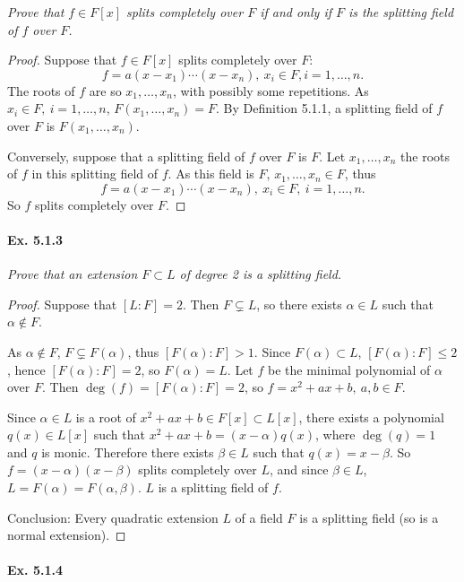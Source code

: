 \documentclass[11pt,a4paper]{article}
\begin{document}
{\it Prove that $f\in F[x]$ splits completely over $F$ if and only if $F$ is the splitting field of $f$ over $F$.
}

\begin{proof}
Suppose that $f \in F[x]$ splits completely over $F$:
$$f = a(x-x_1)\cdots(x-x_n), \ x_i \in F,i=1,\ldots,n.$$
The roots of $f$ are so $x_1,\ldots, x_n$, with possibly some repetitions. As $x_i \in F,\ i=1,\ldots,n$, $F(x_1,\ldots,x_n) = F$.
By Definition 5.1.1, a splitting field of $f$ over $F$ is  $F(x_1,\ldots,x_n)$. 

Conversely, suppose that a splitting field of $f$ over $F$ is $F$. Let $x_1,\ldots,x_n$ the roots of $f$ in this splitting field of $f$. As this field is $F$, $x_1,\ldots ,x_n \in F$, thus
$$f = a(x-x_1)\cdots(x-x_n), \ x_i \in F,\ i=1,\ldots,n.$$
So $f$ splits completely over $F$.
\end{proof}

\paragraph{Ex. 5.1.3}

{\it Prove that an extension $F\subset L$ of degree 2 is a splitting field.
}

\begin{proof}
Suppose that $[L:F]=2$. Then $F\subsetneq L$, so there exists $\alpha \in L$  such that $\alpha \not \in F$.

As $\alpha \not \in F$, $F \subsetneq F(\alpha)$, thus $[F(\alpha):F]>1$. Since $F(\alpha) \subset L$, $[F(\alpha):F]\leq 2$, hence $[F(\alpha):F] =  2$, so $F(\alpha) = L$.
Let $f$ be the minimal polynomial of $\alpha$ over $F$. Then $\deg(f) =[F(\alpha):F] =  2$, so $f = x^2+ax+b,\ a,b\in F$.

Since $\alpha \in L$ is a root of $x^2 +ax +b \in F[x] \subset L[x]$, there exists a polynomial $q(x) \in L[x]$ such that $x^2 +a x + b = (x- \alpha)q(x)$, where $\deg(q) = 1$ and $q$ is monic. Therefore there exists $\beta \in L$ such that $q(x) = x- \beta$. So $f = (x-\alpha)(x-\beta)$ splits completely over $L$, and since $\beta \in L$,  $L = F(\alpha) = F(\alpha,\beta)$. $L$ is a splitting field of $f$.

Conclusion: Every quadratic extension $L$ of a field $F$ is a splitting field (so is a normal extension).
\end{proof}


\paragraph{Ex. 5.1.4}
\end{document}
